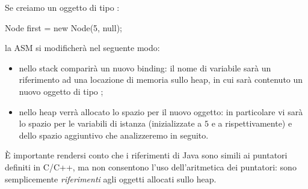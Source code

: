 Se creiamo un oggetto di tipo :
\begin{Java}
    Node first = new Node(5, null);
\end{Java} 
la ASM si modificherà nel seguente modo:
\begin{itemize}
    \item nello stack comparirà un nuovo binding: il nome di variabile  sarà un riferimento ad una locazione di memoria sullo heap, in cui sarà contenuto un nuovo oggetto di tipo ;
    \item nello heap verrà allocato lo spazio per il nuovo oggetto: in particolare vi sarà lo spazio per le variabili di istanza (inizializzate a $5$ e a  rispettivamente) e dello spazio aggiuntivo che analizzeremo in seguito.
\end{itemize}

È importante rendersi conto che i riferimenti di Java sono simili ai puntatori definiti in C/C++, ma non consentono l'uso dell'aritmetica dei puntatori: sono semplicemente \emph{riferimenti} agli oggetti allocati sullo heap.